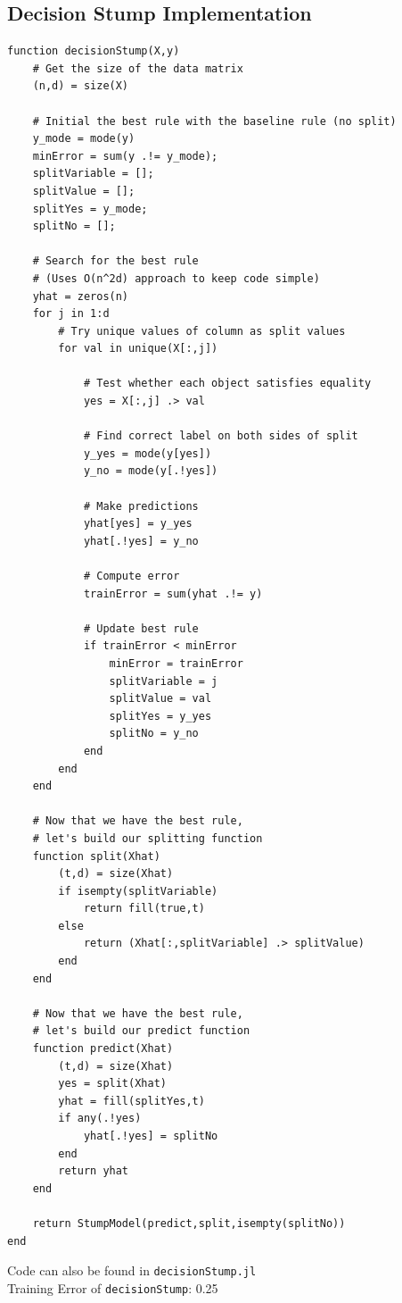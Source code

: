 \documentclass{article}
\begin{document}
\subsection{Decision Stump Implementation}
\begin{verbatim}
function decisionStump(X,y)
    # Get the size of the data matrix
    (n,d) = size(X)

    # Initial the best rule with the baseline rule (no split)
    y_mode = mode(y)
    minError = sum(y .!= y_mode);
    splitVariable = [];
    splitValue = [];
    splitYes = y_mode;
    splitNo = [];

    # Search for the best rule
    # (Uses O(n^2d) approach to keep code simple)
    yhat = zeros(n)
    for j in 1:d
        # Try unique values of column as split values
        for val in unique(X[:,j])

            # Test whether each object satisfies equality
            yes = X[:,j] .> val

            # Find correct label on both sides of split
            y_yes = mode(y[yes])
            y_no = mode(y[.!yes])

            # Make predictions
            yhat[yes] = y_yes
            yhat[.!yes] = y_no

            # Compute error
            trainError = sum(yhat .!= y)

            # Update best rule
            if trainError < minError
	            minError = trainError
                splitVariable = j
                splitValue = val
                splitYes = y_yes
                splitNo = y_no
            end
        end
    end

    # Now that we have the best rule,
    # let's build our splitting function
    function split(Xhat)
        (t,d) = size(Xhat)
        if isempty(splitVariable)
            return fill(true,t)
        else
		    return (Xhat[:,splitVariable] .> splitValue)
        end
    end

    # Now that we have the best rule,
    # let's build our predict function
    function predict(Xhat)
        (t,d) = size(Xhat)
        yes = split(Xhat)
        yhat = fill(splitYes,t)
        if any(.!yes)
            yhat[.!yes] = splitNo
        end
        return yhat
    end

    return StumpModel(predict,split,isempty(splitNo))
end
\end{verbatim}

Code can also be found in \texttt{decisionStump.jl}\\
Training Error of \texttt{decisionStump}: 0.25
\end{document}
